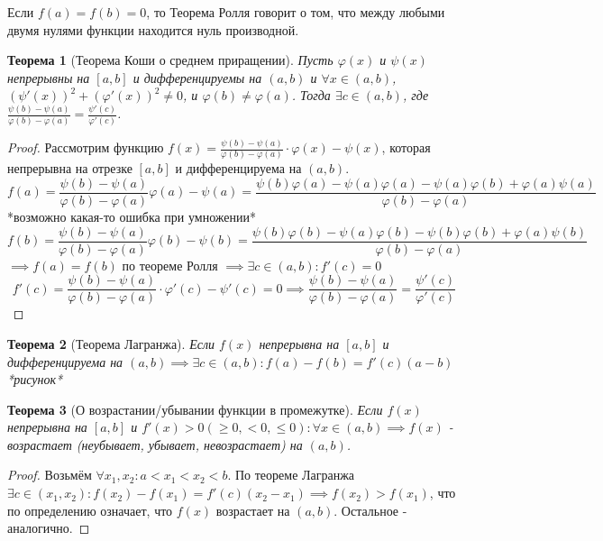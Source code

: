 \documentclass[a4paper,oneside]{article}
\newtheorem{theorem}{Теорема}[subsection]
\theoremstyle{definition}
\theoremstyle{definition}
\theoremstyle{definition}
\begin{document}
    Если $f(a) = f(b) = 0$, то Теорема Ролля говорит о том, что между любыми двумя нулями функции находится нуль производной.
\begin{theorem}[Теорема Коши о среднем приращении]
        Пусть $\varphi(x)$ и $\psi(x)$ непрерывны на $[a, b]$ и дифференцируемы на $(a, b)$ и $\forall x \in (a, b)$, $(\psi'(x))^2+(\varphi'(x))^2 \neq 0$, и $\varphi(b) \neq \varphi(a)$.
        Тогда $\exists c \in (a, b)$, где $\frac{\psi(b) - \psi(a)}{\varphi(b) - \varphi(a)} = \frac{\psi'(c)}{\varphi'(c)}$.
\end{theorem}
\begin{proof}
        Рассмотрим функцию $f(x) = \frac{\psi(b) - \psi(a)}{\varphi(b) - \varphi(a)} \cdot \varphi(x) - \psi(x)$, которая непрерывна на отрезке $[a, b]$ и дифференцируема на $(a, b)$.
        \[f(a)=\frac{\psi(b) - \psi(a)}{\varphi(b) - \varphi(a)}\varphi(a)-\psi(a) = \frac{\psi(b)\varphi(a)-\psi(a)\varphi(a)-\psi(a)\varphi(b)+\varphi(a)\psi(a)}{\varphi(b) - \varphi(a)}\] *возможно какая-то ошибка при умножении*
        \[f(b)=\frac{\psi(b) - \psi(a)}{\varphi(b) - \varphi(a)}\varphi(b)-\psi(b) = \frac{\psi(b)\varphi(b)-\psi(a)\varphi(b)-\psi(b)\varphi(b)+\varphi(a)\psi(b)}{\varphi(b) - \varphi(a)}\]
        $\implies f(a)=f(b)$ по теореме Ролля $\implies \exists c \in (a, b): f'(c) = 0$
        \[f'(c) = \frac{\psi(b)-\psi(a)}{\varphi(b)-\varphi(a)} \cdot \varphi'(c)-\psi'(c) = 0 \implies \frac{\psi(b)-\psi(a)}{\varphi(b)-\varphi(a)} = \frac{\psi'(c)}{\varphi'(c)}\]
\end{proof}

\begin{theorem}[Теорема Лагранжа]
        Если $f(x)$ непрерывна на $[a, b]$ и дифференцируема на $(a, b) \implies \exists c \in (a, b): f(a)-f(b)=f'(c)(a-b)$ *рисунок*
\end{theorem}

\begin{theorem}[О возрастании/убывании функции в промежутке]
    Если $f(x)$ непрерывна на $[a, b]$ и $f'(x)>0 (\geq 0, <0, \leq 0): \forall x \in (a, b) \implies f(x)$ - возрастает (неубывает, убывает, невозрастает) на $(a, b)$.
\end{theorem}
\begin{proof}
    Возьмём $\forall x_1, x_2: a < x_1 < x_2 < b$. По теореме Лагранжа $\exists c \in (x_1, x_2): f(x_2) - f(x_1) = f'(c)(x_2-x_1) \implies f(x_2) > f(x_1)$, что по определению означает, что $f(x)$ возрастает на $(a, b)$. Остальное - аналогично. 
\end{proof}
\end{document}
